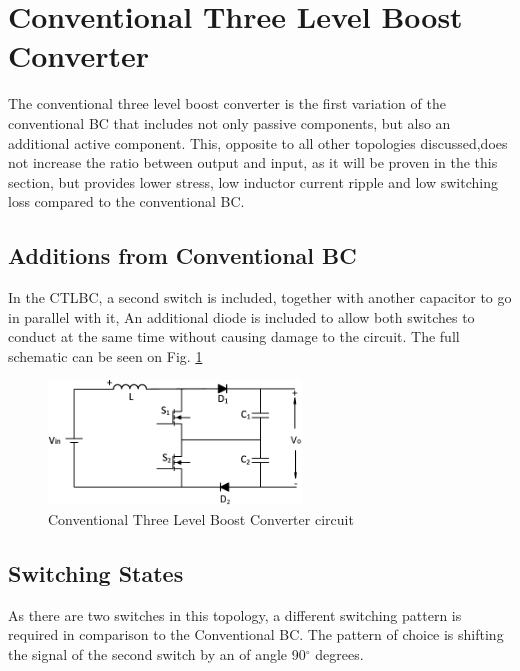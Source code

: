 \section{Conventional Three Level Boost Converter}\label{ch:TLBC}

The conventional three level boost converter is the first variation of the conventional BC that includes not only passive components, but also an additional active component. This, opposite to all other topologies discussed,does not increase the ratio between output and input, as it will be proven in the this section, but provides lower stress, low inductor current ripple and low switching loss compared to the conventional BC. 

\subsection{Additions from Conventional BC}
In the CTLBC, a second switch is included, together with another capacitor to go in parallel with it, An additional diode is included to allow both switches to conduct at the same time without causing damage to the circuit. The full schematic can be seen on Fig. \ref{fig:CTLBC}  

\begin{figure} [H]
   \centering
   \includegraphics[width=0.6\textwidth]{figures/dConventionalThreeLevelBC/Three_level.pdf}
    \caption{Conventional Three Level Boost Converter circuit}
	\label{fig:CTLBC}
\end{figure}
\subsection{Switching States}

As there are two switches in this topology, a different switching pattern is required in comparison to the Conventional BC. The pattern of choice is shifting the signal of the second switch by an of angle 90$^\circ$ degrees.

